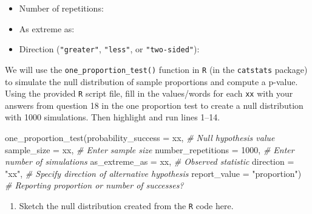 \documentclass[
]{report}
\newenvironment{Shaded}{\begin{snugshade}}{\end{snugshade}}
\newcommand{\AttributeTok}[1]{\textcolor[rgb]{0.77,0.63,0.00}{#1}}
\newcommand{\CommentTok}[1]{\textcolor[rgb]{0.56,0.35,0.01}{\textit{#1}}}
\newcommand{\DecValTok}[1]{\textcolor[rgb]{0.00,0.00,0.81}{#1}}
\newcommand{\FunctionTok}[1]{\textcolor[rgb]{0.00,0.00,0.00}{#1}}
\newcommand{\NormalTok}[1]{#1}
\newcommand{\StringTok}[1]{\textcolor[rgb]{0.31,0.60,0.02}{#1}}
\providecommand{\tightlist}{%
  \setlength{\itemsep}{0pt}\setlength{\parskip}{0pt}}
\begin{document}
\vspace{.2in}

\begin{itemize}
\tightlist
\item
  Number of repetitions:
\end{itemize}

\vspace{.2in}

\begin{itemize}
\tightlist
\item
  As extreme as:
\end{itemize}

\vspace{.2in}

\begin{itemize}
\tightlist
\item
  Direction (\texttt{"greater"}, \texttt{"less"}, or \texttt{"two-sided"}):
\end{itemize}

\vspace{.2in}

We will use the \texttt{one\_proportion\_test()} function in \texttt{R} (in the \texttt{catstats} package) to simulate the null distribution of sample proportions and compute a p-value. Using the provided \texttt{R} script file, fill in the values/words for each \texttt{xx} with your answers from question 18 in the one proportion test to create a null distribution with 1000 simulations. Then highlight and run lines 1--14.

\begin{Shaded}
\begin{Highlighting}[]
\FunctionTok{one\_proportion\_test}\NormalTok{(}\AttributeTok{probability\_success =}\NormalTok{ xx, }\CommentTok{\# Null hypothesis value}
          \AttributeTok{sample\_size =}\NormalTok{ xx, }\CommentTok{\# Enter sample size}
          \AttributeTok{number\_repetitions =} \DecValTok{1000}\NormalTok{, }\CommentTok{\# Enter number of simulations}
          \AttributeTok{as\_extreme\_as =}\NormalTok{ xx, }\CommentTok{\# Observed statistic}
          \AttributeTok{direction =} \StringTok{"xx"}\NormalTok{, }\CommentTok{\# Specify direction of alternative hypothesis}
          \AttributeTok{report\_value =} \StringTok{"proportion"}\NormalTok{) }\CommentTok{\# Reporting proportion or number of successes?}
\end{Highlighting}
\end{Shaded}

\begin{enumerate}
\def\labelenumi{\arabic{enumi}.}
\setcounter{enumi}{18}
\tightlist
\item
  Sketch the null distribution created from the \texttt{R} code here.
\end{enumerate}
\end{document}
